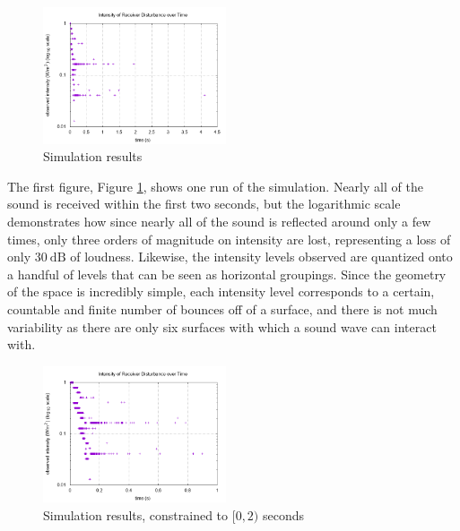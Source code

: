 \documentclass[10pt]{article}
\begin{document}
\begin{figure}
  \begin{center}
    \includegraphics[width=0.48\textwidth]{results-paper}
  \end{center}
  \caption{Simulation results}
  \label{unconstrained}
\end{figure}

The first figure, Figure \ref{unconstrained}, shows one run of the simulation.
Nearly all of the sound is received within the first two seconds, but the
logarithmic scale demonstrates how since nearly all of the sound is reflected
around only a few times, only three orders of magnitude on intensity are lost,
representing a loss of only $30~\mathrm{dB}$ of loudness.  Likewise, the
intensity levels observed are quantized onto a handful of levels that can be
seen as horizontal groupings.  Since the geometry of the space is incredibly
simple, each intensity level corresponds to a certain, countable and finite
number of bounces off of a surface, and there is not much variability as there
are only six surfaces with which a sound wave can interact with.
\begin{figure}
  \begin{center}
    \includegraphics[width=0.48\textwidth]{results-paper-constrained}
  \end{center}
  \caption{Simulation results, constrained to $[0, 2)$ seconds}
  \label{constrained}
\end{figure}
\end{document}
